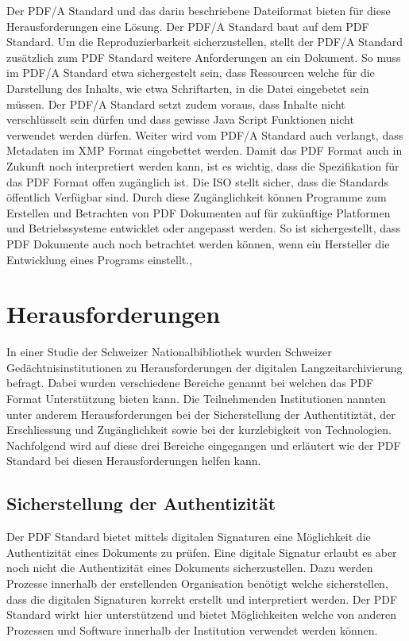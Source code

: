 \documentclass[a4paper,oneside, 12pt]{report}
\begin{document}
Der PDF/A Standard und das darin beschriebene Dateiformat bieten für diese Herausforderungen eine Lösung. Der PDF/A Standard baut auf dem PDF Standard. Um die Reproduzierbarkeit sicherzustellen, stellt der PDF/A Standard zusätzlich zum PDF Standard weitere Anforderungen an ein Dokument. So muss im PDF/A Standard etwa sichergestelt sein, dass Ressourcen welche für die Darstellung des Inhalts, wie etwa Schriftarten, in die Datei eingebetet sein müssen. Der PDF/A Standard setzt zudem voraus, dass Inhalte nicht verschlüsselt sein dürfen und dass gewisse Java Script Funktionen nicht verwendet werden dürfen. Weiter wird vom PDF/A Standard auch verlangt, dass Metadaten im \ac{XMP} Format eingebettet werden. Damit das PDF Format auch in Zukunft noch interpretiert werden kann, ist es wichtig, dass die Spezifikation für das PDF Format offen zugänglich ist. Die \ac{ISO} stellt sicher, dass die Standards öffentlich Verfügbar sind. Durch diese Zugänglichkeit können Programme zum Erstellen und Betrachten von PDF Dokumenten auf für zukünftige Platformen und Betriebssysteme entwicklet oder angepasst werden. So ist sichergestellt, dass PDF Dokumente auch noch betrachtet werden können, wenn ein Hersteller die Entwicklung eines Programs einstellt.\cite{pdfanutshell}, \cite{Arms2005DigitalFF}

 
\chapter{Herausforderungen}\label{sec:herausforderungen}
In einer Studie der Schweizer Nationalbibliothek wurden Schweizer Gedächtnisinstitutionen zu Herausforderungen der digitalen Langzeitarchivierung befragt. Dabei wurden verschiedene Bereiche genannt bei welchen das PDF Format Unterstützung bieten kann. Die Teilnehmenden Institutionen nannten unter anderem Herausforderungen bei der Sicherstellung der Authentitiztät, der Erschliessung und Zugänglichkeit sowie bei der kurzlebigkeit von Technologien. Nachfolgend wird auf diese drei Bereiche eingegangen und erläutert wie der PDF Standard bei diesen Herausforderungen helfen kann. \cite{lzaschweiz}

\section{Sicherstellung der Authentizität}
Der PDF Standard bietet mittels digitalen Signaturen eine Möglichkeit die Authentizität eines Dokuments zu prüfen. Eine digitale Signatur erlaubt es aber noch nicht die Authentizität eines Dokuments sicherzustellen. Dazu werden Prozesse innerhalb der erstellenden Organisation benötigt welche sicherstellen, dass die digitalen Signaturen korrekt erstellt und interpretiert werden. Der PDF Standard wirkt hier unterstützend und bietet Möglichkeiten welche von anderen Prozessen und Software innerhalb der Institution verwendet werden können.
\end{document}
